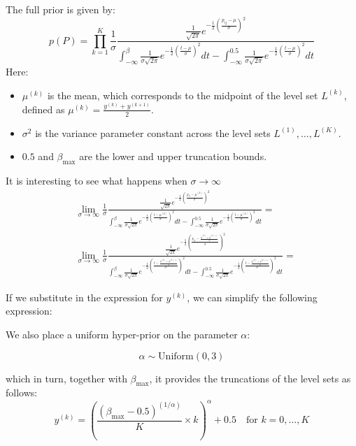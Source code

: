 \documentclass[11pt]{amsart}
\begin{document}
The full prior is given by:
\[
p(P) = \prod_{k=1}^K \frac{1}{\sigma} \frac{\frac{1}{\sqrt{2\pi}} e^{-\frac{1}{2}\left(\frac{p_{ij} - \mu}{\sigma}\right)^2}}{\int_{-\infty}^\beta \frac{1}{\sigma\sqrt{2\pi}} e^{-\frac{1}{2}\left(\frac{t- \mu}{\sigma}\right)^2 }dt -\int_{-\infty}^{0.5} \frac{1}{\sigma\sqrt{2\pi}} e^{-\frac{1}{2}\left(\frac{t- \mu}{\sigma}\right)^2 }dt}
\]
Here:
\begin{itemize}
\item $\mu^{(k)}$ is the mean, which corresponds to the midpoint of the level set $L^{(k)}$, defined as $\mu^{(k)} = \frac{y^{(k)}+y^{(k+1)}}{2}$.
\item $\sigma^{2}$ is the variance parameter constant across the level sets $L^{(1)},\ldots,L^{(K)}$.
\item $0.5$ and $\beta_{\max}$ are the lower and upper truncation bounds.
\end{itemize}

It is interesting to see what happens when $\sigma \rightarrow \infty$
\begin{align}
&\lim_{\sigma \rightarrow \infty} \frac{1}{\sigma} \frac{\frac{1}{\sqrt{2\pi}} e^{-\frac{1}{2}\left(\frac{p_{ij} - \mu^{(k)}}{\sigma}\right)^2}}{\int_{-\infty}^\beta \frac{1}{\sigma\sqrt{2\pi}} e^{-\frac{1}{2}\left(\frac{t- \mu^{(k)}}{\sigma}\right)^2 }dt -\int_{-\infty}^{0.5} \frac{1}{\sigma\sqrt{2\pi}} e^{-\frac{1}{2}\left(\frac{t- \mu^{(k)}}{\sigma}\right)^2 }dt} = \\
&\lim_{\sigma \rightarrow \infty} \frac{1}{\sigma} \frac{\frac{1}{\sqrt{2\pi}} e^{-\frac{1}{2}\left(\frac{p_{ij} -  \frac{y^{(k)}+y^{(k+1)}}{2}}{\sigma}\right)^2}}{\int_{-\infty}^\beta \frac{1}{\sigma\sqrt{2\pi}} e^{-\frac{1}{2}\left(\frac{t-  \frac{y^{(k)}+y^{(k+1)}}{2}}{\sigma}\right)^2 }dt -\int_{-\infty}^{0.5} \frac{1}{\sigma\sqrt{2\pi}} e^{-\frac{1}{2}\left(\frac{t-  \frac{y^{(k)}+y^{(k+1)}}{2}}{\sigma}\right)^2 }dt} = 
\end{align}


If we substitute in the expression for $y^{(k)}$, we can simplify the following expression:




We also place a uniform hyper-prior on the parameter $\alpha$:

\[
\alpha \sim \text{Uniform}(0, 3)
\]

which in turn, together with $\beta_{\max}$, it provides the truncations of the level sets as follows:
\begin{equation}
\label{eq:truncations}
y^{(k)} = \left( \frac{(\beta_{\max} - 0.5)^{(1/\alpha)}}{K} \times k \right)^\alpha + 0.5 \quad \text{for } k = 0, \ldots, K
\end{equation}
\end{document}
